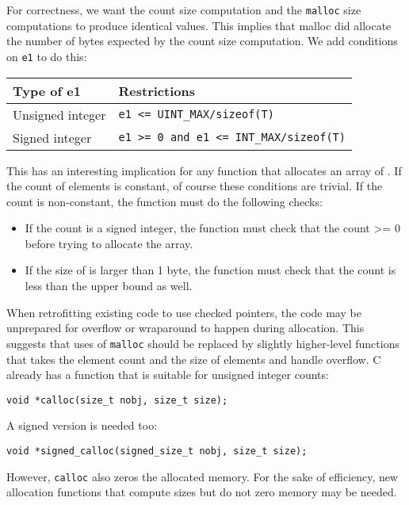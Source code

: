For correctness, we want the count size computation and the
\texttt{malloc} size computations to produce identical values. This
implies that malloc did allocate the number of bytes expected by the
count size computation. We add conditions on \texttt{e1} to do this:

\begin{longtable}[c]{ll}
\toprule
Type of e1 & Restrictions\tabularnewline
\midrule
\endhead
Unsigned integer & \texttt{e1 <= UINT\_MAX/sizeof(T)}\tabularnewline
Signed integer & \texttt{e1 >= 0 and e1 <= INT\_MAX/sizeof(T)}\tabularnewline
\bottomrule
\end{longtable}

This has an interesting implication for any function that allocates an
array of . If the count of elements is constant, of course these
conditions are trivial. If the count is non-constant, the function
must do the following checks:

\begin{itemize}
\item
  If the count is a signed integer, the function must check that the
  count \textgreater{}= 0 before trying to allocate the array.
\item
  If the size of  is larger than 1 byte, the function must check that the
  count is less than the upper bound as well.
\end{itemize}

When retrofitting existing code to use checked pointers, the code may be
unprepared for overflow or wraparound to happen during allocation. This
suggests that uses of \texttt{malloc} should be replaced by slightly
higher-level functions that takes the element count and the size of
elements and handle overflow. C already has a function that is suitable
for unsigned integer counts:

\begin{verbatim}
void *calloc(size_t nobj, size_t size);
\end{verbatim}

A signed version is needed too:
\begin{verbatim}
void *signed_calloc(signed_size_t nobj, size_t size);
\end{verbatim}
However, \texttt{calloc} also zeros the allocated memory.  For the sake of efficiency,
new allocation functions that compute sizes but do not zero memory may be needed.